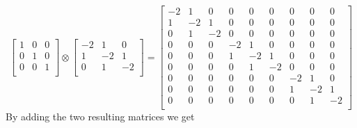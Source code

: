 \documentclass[authoryearcitations]{UoYCSproject}
\begin{document}
\begin{equation}
\begin{bmatrix}
  1 & 0 & 0 \\
  0 & 1 & 0 \\
  0 & 0 & 1 \\
\end{bmatrix} \otimes \begin{bmatrix}
                         -2 & 1 & 0 \\
                          1 & -2 & 1 \\
                          0 & 1 & -2 \\
                      \end{bmatrix} = \begin{bmatrix}
                                        -2 & 1 & 0 & 0 & 0 & 0 & 0 & 0 & 0 \\
                                        1 & -2 & 1 & 0 & 0 & 0 & 0 & 0 & 0 \\ 
                                        0 & 1 & -2 & 0 & 0 & 0 & 0 & 0 & 0 \\
                                        0 & 0 & 0 & -2 & 1 & 0 & 0 & 0 & 0 \\
                                        0 & 0 & 0 & 1 & -2 & 1 & 0 & 0 & 0 \\
                                        0 & 0 & 0 & 0 & 1 & -2 & 0 & 0 & 0 \\
                                        0 & 0 & 0 & 0 & 0 & 0 & -2 & 1 & 0 \\
                                        0 & 0 & 0 & 0 & 0 & 0 & 1 & -2 & 1 \\
                                        0 & 0 & 0 & 0 & 0 & 0 & 0 & 1 & -2 \\
                                      \end{bmatrix}
\label{eq:tensorExample2}
\end{equation}
By adding the two resulting matrices we get
\end{document}
